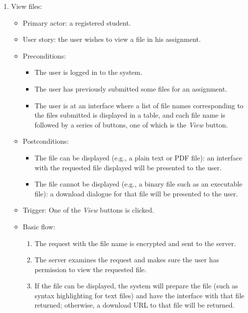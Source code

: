 \begin{enumerate}
\item View files:
\begin{itemize}
    \item Primary actor: a registered student.
    \item User story: the user wishes to view a file in his assignment.
    \item Preconditions:
        \begin{itemize}
            \item The user is logged in to the system.
            \item The user has previously submitted some files for an
                assignment.
            \item The user is at an interface where a list of file names
                corresponding to the files submitted is displayed in a table,
                and each file name is followed by a series of buttons,
                one of which is the \emph{View} button.
        \end{itemize}
    \item Postconditions:
        \begin{itemize}
            \item The file can be displayed (e.g., a plain text or PDF file): 
                an interface with the requested file
                displayed will be presented to the user.
            \item The file cannot be displayed (e.g., a binary file such as an executable
                file): a download dialogue for that file will be presented to
                the user.
        \end{itemize}
    \item Trigger: One of the \emph{View} buttons is clicked.
    \item Basic flow:
        \begin{enumerate}
            \item The request with the file name is encrypted and sent to the server.
            \item The server examines the request and makes sure the user
                has permission to view the requested file.
            \item If the file can be displayed, the system will prepare the
                file (such as syntax highlighting for text files) and
                have the interface with that file returned; otherwise, a download
                URL to that file will be returned.
        \end{enumerate}
\end{itemize}
\end{enumerate}


